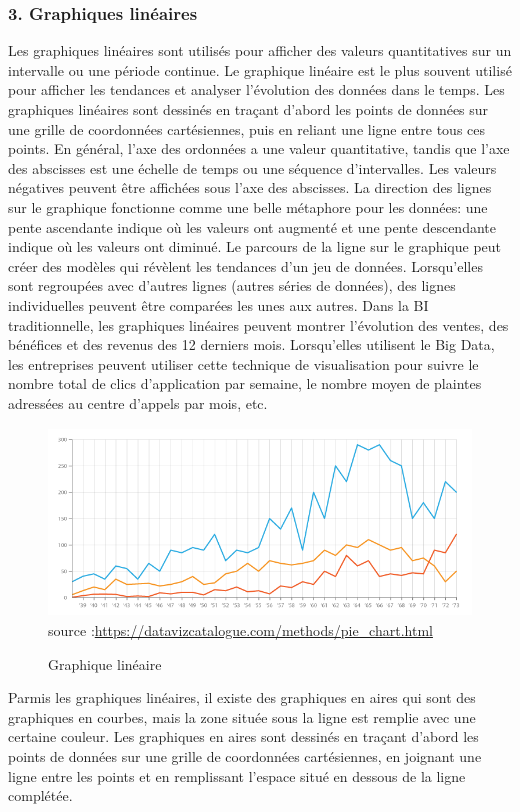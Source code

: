 \documentclass[french, a4paper, 12pt]{report}
\begin{document}
\subsubsection{3. Graphiques linéaires}
Les graphiques linéaires sont utilisés pour afficher des valeurs quantitatives sur un intervalle ou une période continue. Le graphique linéaire est le plus souvent utilisé pour afficher les tendances et analyser l’évolution des données dans le temps.
Les graphiques linéaires sont dessinés en traçant d'abord les points de données sur une grille de coordonnées cartésiennes, puis en reliant une ligne entre tous ces points. En général, l'axe des ordonnées a une valeur quantitative, tandis que l'axe des abscisses est une échelle de temps ou une séquence d'intervalles. Les valeurs négatives peuvent être affichées sous l'axe des abscisses.
La direction des lignes sur le graphique fonctionne comme une belle métaphore pour les données: une pente ascendante indique où les valeurs ont augmenté et une pente descendante indique où les valeurs ont diminué. Le parcours de la ligne sur le graphique peut créer des modèles qui révèlent les tendances d'un jeu de données.
Lorsqu'elles sont regroupées avec d'autres lignes (autres séries de données), des lignes individuelles peuvent être comparées les unes aux autres. 
Dans la BI traditionnelle, les graphiques linéaires peuvent montrer l'évolution des ventes, des bénéfices et des revenus des 12 derniers mois. Lorsqu'elles utilisent le Big Data, les entreprises peuvent utiliser cette technique de visualisation pour suivre le nombre total de clics d'application par semaine, le nombre moyen de plaintes adressées au centre d'appels par mois, etc.
\begin{figure}[!ht]
    \centering
    \includegraphics[height=5cm]{images/line_graph.png}
    \scriptsize{source :\url{https://datavizcatalogue.com/methods/pie_chart.html}}
    \caption{Graphique linéaire}
    \label{fig:1.5}
\end{figure}
Parmis les graphiques linéaires, il existe des graphiques en aires qui sont des graphiques en courbes, mais la zone située sous la ligne est remplie avec une certaine couleur. Les graphiques en aires sont dessinés en traçant d'abord les points de données sur une grille de coordonnées cartésiennes, en joignant une ligne entre les points et en remplissant l'espace situé en dessous de la ligne complétée.
\end{document}
